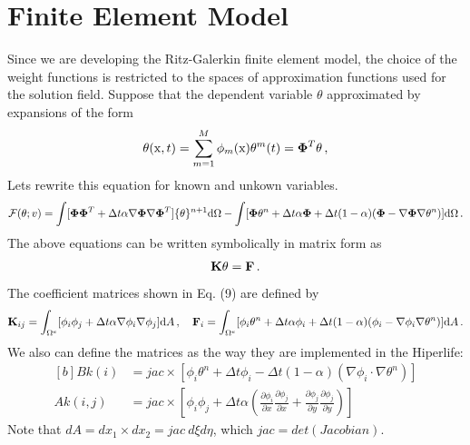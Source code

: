 \documentclass[]{article}
\begin{document}
\section{Finite Element Model} \label{sec: fem}
Since we are developing the Ritz-Galerkin finite element model, the choice of the weight functions is restricted to the spaces of approximation functions used for the solution field. Suppose that the dependent variable $\theta$ approximated by expansions of the form
\begin{equation}\label{eq5}
	\begin{aligned}
		\theta(\mathrm{x}, t)= \sum_{m=1}^{M} \phi_m(\mathrm{x}) \mathbf{\theta}^m(t) = \boldsymbol{\Phi}^T\mathbf{\theta} \thinspace,
	\end{aligned}
\end{equation}
Lets rewrite this equation for known and unkown variables.
\begin{equation}\label{eq8}
	\begin{aligned}[b]
		\mathcal{F}(\theta; v)=\int [\boldsymbol{\Phi}\boldsymbol{\Phi}^T + \Delta t \alpha\nabla\boldsymbol{\Phi}\nabla\boldsymbol{\Phi}^T]\{\theta\}^{n+1} \mathrm{d} \Omega - \int  [\boldsymbol{\Phi}\theta^{n}+\Delta t \alpha \boldsymbol{\Phi} + \Delta t (1-\alpha) (\boldsymbol{\Phi} - \nabla \boldsymbol{\Phi} \nabla\theta^n)]\mathrm{d} \Omega\thinspace.
	\end{aligned}
\end{equation}
The above equations can be written symbolically in matrix form as
\begin{equation}\label{eq8}
	\begin{aligned}
		\mathbf{K}\mathbf{\theta} = \mathbf{F}\thinspace.
	\end{aligned}
\end{equation}
The coefficient matrices shown in Eq. (9) are defined by
\begin{equation}\label{eq10}
	\begin{aligned}
		\mathbf{K}_{ij} = \int_{\Omega^e} [\phi_i\phi_j + \Delta t \alpha\nabla\phi_i\nabla\phi_j]\mathrm{d}A\thinspace, \quad
		\mathbf{F}_i =\int_{\Omega^e} [\phi_i\theta^{n}+\Delta t \alpha \phi_i + \Delta t (1-\alpha) (\phi_i - \nabla \phi_i \nabla\theta^n)]\mathrm{d}A \thinspace.
	\end{aligned}
\end{equation}
We also can define the matrices as the way they are implemented in the Hiperlife:
\begin{equation}\label{eq9}
	\begin{aligned}[b]
		Bk (i) &= jac \times [\phi_i \theta^n + \Delta t  \phi_i - \Delta t (1-\alpha)(\nabla \phi_i \cdot \nabla \theta^n)] \\
		Ak (i,j) &=  jac \times [\phi_i\phi_j + \Delta t \alpha(\frac{\partial \phi_i}{\partial x}
		\frac{\partial \phi_j}{\partial x} + \frac{\partial \phi_j}{\partial y} 
		\frac{\partial \phi_j}{\partial y})]  
	\end{aligned}
\end{equation}
Note that $dA=dx_{1} \times dx_{2}=jac \ d\xi d\eta$, which $jac=det(Jacobian)$.
\end{document}
